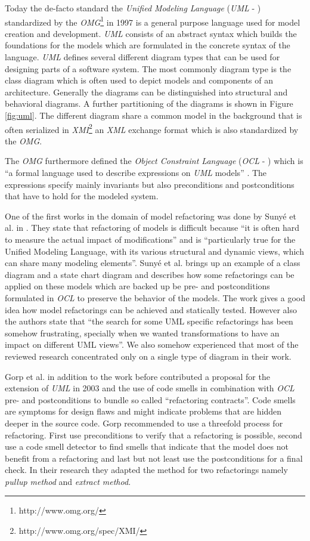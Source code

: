 \documentclass{llncs}
\begin{document}
Today the de-facto standard the \textit{Unified Modeling Language} (\textit{UML} - \cite{man:UML}) standardized by the \textit{OMG}\footnote{http://www.omg.org/} in 1997 is a general purpose language used for model creation and development. \textit{UML} consists of an abstract syntax which builds the foundations for the models which are formulated in the concrete syntax of the language. \textit{UML} defines several different diagram types that can be used for designing parts of a software system. The most commonly diagram type is the class diagram which is often used to depict models and components of an architecture. Generally the diagrams can be distinguished into structural and behavioral diagrams. A further partitioning of the diagrams is shown in Figure \ref{fig:uml}. The different diagram share a common model in the background that is often serialized in \textit{XMI}\footnote{http://www.omg.org/spec/XMI/} an \textit{XML} exchange format which is also standardized by the \textit{OMG}. 

The \textit{OMG} furthermore defined the \textit{Object Constraint Language} (\textit{OCL} - \cite{man:OCL}) which is ``a formal language used to describe expressions on \textit{UML} models'' \cite{man:OCL}. The expressions specify mainly invariants but also preconditions and postconditions that have to hold for the modeled system.

One of the first works in the domain of model refactoring was done by Suny{\'e} et al. in \cite{DBLP:conf/uml/SunyePTJ01}. They state that refactoring of models is difficult because ``it is often hard to measure the actual impact of modifications'' and is ``particularly true for the Unified Modeling Language, with its various structural and dynamic views, which can share many modeling elements''. Suny{\'e} et al. brings up an example of a class diagram and a state chart diagram and describes how some refactorings can be applied on these models which are backed up be pre- and postconditions formulated in \textit{OCL} to preserve the behavior of the models. The work gives a good idea how model refactorings can be achieved and statically tested. However also the authors state that ``the search for some UML specific refactorings has been somehow frustrating, specially when we wanted transformations to have an impact on different UML views''. We also somehow experienced that most of the reviewed research concentrated only on a single type of diagram in their work.

Gorp et al. \cite{gorp03} in addition to the work before contributed a proposal for the extension of \textit{UML} in 2003 and the use of code smells in combination with \textit{OCL} pre- and postconditions to bundle so called ``refactoring contracts''. Code smells are symptoms for design flaws and might indicate problems that are hidden deeper in the source code. Gorp recommended to use a threefold process for refactoring. First use preconditions to verify that a refactoring is possible, second use a code smell detector to find smells that indicate that the model does not benefit from a refactoring and last but not least use the postconditions for a final check. In their research they adapted the method for two refactorings namely \textit{pullup method} and \textit{extract method}.
\end{document}
